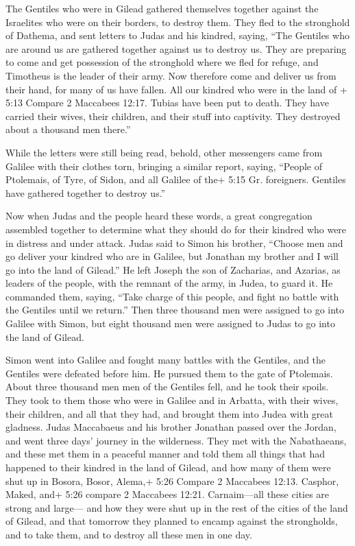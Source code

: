  The Gentiles who were in Gilead gathered themselves
together against the Israelites who were on their borders, to destroy
them. They fled to the stronghold of Dathema,  and sent
letters to Judas and his kindred, saying, ``The Gentiles who are around
us are gathered together against us to destroy us.  They
are preparing to come and get possession of the stronghold where we fled
for refuge, and Timotheus is the leader of their army.  Now
therefore come and deliver us from their hand, for many of us have
fallen.  All our kindred who were in the land of + 5:13
Compare 2 Maccabees 12:17. Tubias have been put to death. They have
carried their wives, their children, and their stuff into captivity.
They destroyed about a thousand men there.''

 While the letters were still being read, behold, other
messengers came from Galilee with their clothes torn, bringing a similar
report,  saying, ``People of Ptolemais, of Tyre, of Sidon,
and all Galilee of the+ 5:15 Gr. foreigners. Gentiles have gathered
together to destroy us.''

 Now when Judas and the people heard these words, a great
congregation assembled together to determine what they should do for
their kindred who were in distress and under attack.  Judas
said to Simon his brother, ``Choose men and go deliver your kindred who
are in Galilee, but Jonathan my brother and I will go into the land of
Gilead.''  He left Joseph the son of Zacharias, and
Azarias, as leaders of the people, with the remnant of the army, in
Judea, to guard it.  He commanded them, saying, ``Take
charge of this people, and fight no battle with the Gentiles until we
return.''  Then three thousand men were assigned to go into
Galilee with Simon, but eight thousand men were assigned to Judas to go
into the land of Gilead.

 Simon went into Galilee and fought many battles with the
Gentiles, and the Gentiles were defeated before him.  He
pursued them to the gate of Ptolemais. About three thousand men men of
the Gentiles fell, and he took their spoils.  They took to
them those who were in Galilee and in Arbatta, with their wives, their
children, and all that they had, and brought them into Judea with great
gladness.  Judas Maccabaeus and his brother Jonathan passed
over the Jordan, and went three days' journey in the wilderness.
 They met with the Nabathaeans, and these met them in a
peaceful manner and told them all things that had happened to their
kindred in the land of Gilead,  and how many of them were
shut up in Bosora, Bosor, Alema,+ 5:26 Compare 2 Maccabees 12:13.
Casphor, Maked, and+ 5:26 compare 2 Maccabees 12:21. Carnaim---all these
cities are strong and large---  and how they were shut up
in the rest of the cities of the land of Gilead, and that tomorrow they
planned to encamp against the strongholds, and to take them, and to
destroy all these men in one day.

